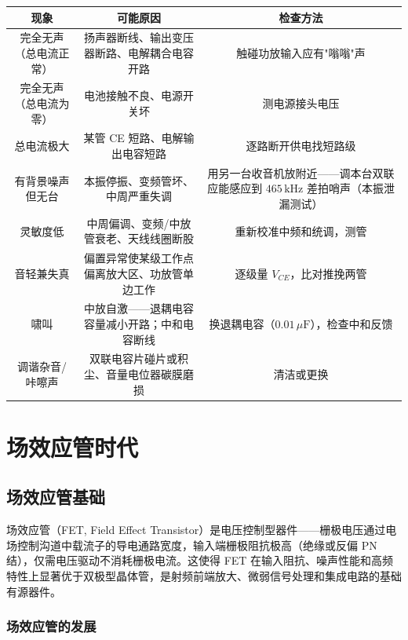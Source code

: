 \documentclass[12pt,UTF8]{ctexbook}
\begin{document}
\begin{center}
\begin{tabular}{c|c|c}
\hline
\textbf{现象} & \textbf{可能原因} & \textbf{检查方法} \\
\hline
完全无声（总电流正常） & 扬声器断线、输出变压器断路、电解耦合电容开路 & 触碰功放输入应有"嗡嗡"声 \\
\hline
完全无声（总电流为零） & 电池接触不良、电源开关坏 & 测电源接头电压 \\
\hline
总电流极大 & 某管 CE 短路、电解输出电容短路 & 逐路断开供电找短路级 \\
\hline
有背景噪声但无台 & 本振停振、变频管坏、中周严重失调 & 用另一台收音机放附近——调本台双联应能感应到 $465\,\mathrm{kHz}$ 差拍哨声（本振泄漏测试） \\
\hline
灵敏度低 & 中周偏调、变频/中放管衰老、天线线圈断股 & 重新校准中频和统调，测管 \\
\hline
音轻兼失真 & 偏置异常使某级工作点偏离放大区、功放管单边工作 & 逐级量 $V_{CE}$，比对推挽两管 \\
\hline
啸叫 & 中放自激——退耦电容容量减小开路；中和电容断线 & 换退耦电容（$0.01\,\mu\mathrm{F}$），检查中和反馈 \\
\hline
调谐杂音/咔嚓声 & 双联电容片碰片或积尘、音量电位器碳膜磨损 & 清洁或更换 \\
\hline
\end{tabular}
\end{center}

\part{场效应管时代}

\chapter{场效应管基础}
\label{sec:fet_basics}

场效应管（FET, Field Effect Transistor）是电压控制型器件——栅极电压通过电场控制沟道中载流子的导电通路宽度，输入端栅极阻抗极高（绝缘或反偏 PN 结），仅需电压驱动不消耗栅极电流。这使得 FET 在输入阻抗、噪声性能和高频特性上显著优于双极型晶体管，是射频前端放大、微弱信号处理和集成电路的基础有源器件。

\section{场效应管的发展}
\label{sec:fet_history}
\end{document}
